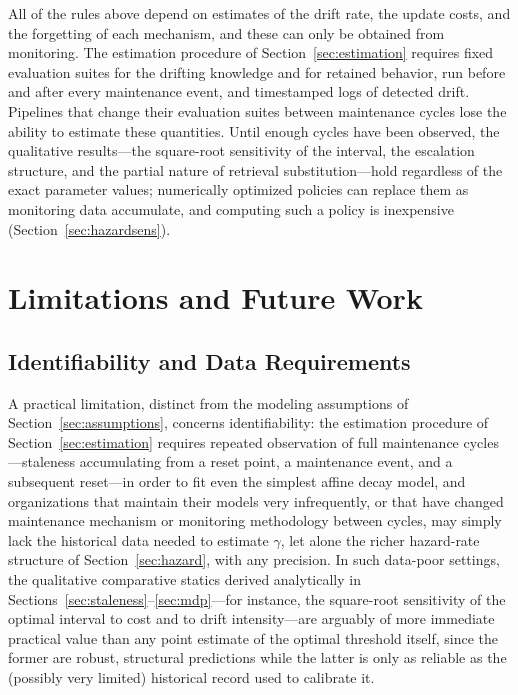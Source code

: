 \documentclass[electronics,article,submit,pdftex,moreauthors]{Definitions/mdpi}
\begin{document}
All of the rules above depend on estimates of the drift rate, the update costs, and the forgetting of each mechanism, and these can only be obtained from monitoring. The estimation procedure of Section~\ref{sec:estimation} requires fixed evaluation suites for the drifting knowledge and for retained behavior, run before and after every maintenance event, and timestamped logs of detected drift. Pipelines that change their evaluation suites between maintenance cycles lose the ability to estimate these quantities. Until enough cycles have been observed, the qualitative results---the square-root sensitivity of the interval, the escalation structure, and the partial nature of retrieval substitution---hold regardless of the exact parameter values; numerically optimized policies can replace them as monitoring data accumulate, and computing such a policy is inexpensive (Section~\ref{sec:hazardsens}).

\section{Limitations and Future Work}\label{sec:limitations}

\subsection{Identifiability and Data Requirements}

A practical limitation, distinct from the modeling assumptions of Section~\ref{sec:assumptions}, concerns identifiability: the estimation procedure of Section~\ref{sec:estimation} requires repeated observation of full maintenance cycles---staleness accumulating from a reset point, a maintenance event, and a subsequent reset---in order to fit even the simplest affine decay model, and organizations that maintain their models very infrequently, or that have changed maintenance mechanism or monitoring methodology between cycles, may simply lack the historical data needed to estimate $\gamma$, let alone the richer hazard-rate structure of Section~\ref{sec:hazard}, with any precision. In such data-poor settings, the qualitative comparative statics derived analytically in Sections~\ref{sec:staleness}--\ref{sec:mdp}---for instance, the square-root sensitivity of the optimal interval to cost and to drift intensity---are arguably of more immediate practical value than any point estimate of the optimal threshold itself, since the former are robust, structural predictions while the latter is only as reliable as the (possibly very limited) historical record used to calibrate it.
\end{document}

